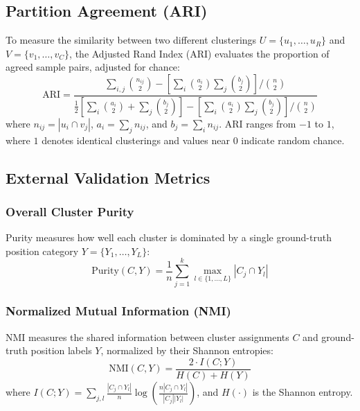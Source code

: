 \documentclass[12pt]{ai_conquer2026}
\begin{document}
\subsection{Partition Agreement (ARI)}
To measure the similarity between two different clusterings $U = \{u_1, \ldots, u_R\}$ and $V = \{v_1, \ldots, v_C\}$, the Adjusted Rand Index (ARI) \cite{hubert1985comparing} evaluates the proportion of agreed sample pairs, adjusted for chance:
\begin{equation}
\text{ARI} = \frac{\sum_{i,j} \binom{n_{ij}}{2} - \left[\sum_i \binom{a_i}{2} \sum_j \binom{b_j}{2}\right] / \binom{n}{2}}{\frac{1}{2}\left[\sum_i \binom{a_i}{2} + \sum_j \binom{b_j}{2}\right] - \left[\sum_i \binom{a_i}{2} \sum_j \binom{b_j}{2}\right] / \binom{n}{2}}
\end{equation}
where $n_{ij} = |u_i \cap v_j|$, $a_i = \sum_j n_{ij}$, and $b_j = \sum_i n_{ij}$. ARI ranges from $-1$ to $1$, where $1$ denotes identical clusterings and values near $0$ indicate random chance.

\subsection{External Validation Metrics}

\subsubsection{Overall Cluster Purity}
Purity measures how well each cluster is dominated by a single ground-truth position category $Y = \{Y_1, \ldots, Y_L\}$:
\begin{equation}
\text{Purity}(C, Y) = \frac{1}{n} \sum_{j=1}^{k} \max_{l \in \{1, \ldots, L\}} |C_j \cap Y_l|
\end{equation}

\subsubsection{Normalized Mutual Information (NMI)}
NMI measures the shared information between cluster assignments $C$ and ground-truth position labels $Y$, normalized by their Shannon entropies:
\begin{equation}
\text{NMI}(C, Y) = \frac{2 \cdot I(C; Y)}{H(C) + H(Y)}
\end{equation}
where $I(C; Y) = \sum_{j,l} \frac{|C_j \cap Y_l|}{n} \log \left(\frac{n |C_j \cap Y_l|}{|C_j| |Y_l|}\right)$, and $H(\cdot)$ is the Shannon entropy.
\end{document}
